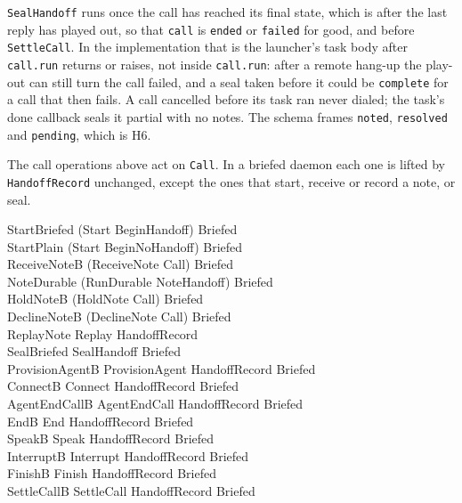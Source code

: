 \documentclass[a4paper,10pt,fleqn]{article}
\begin{document}
\texttt{SealHandoff} runs once the call has reached its final state, which
is after the last reply has played out, so that \texttt{call} is
\texttt{ended} or \texttt{failed} for good, and before
\texttt{SettleCall}. In the implementation that is the launcher's task
body after \texttt{call.run} returns or raises, not inside
\texttt{call.run}: after a remote hang-up the play-out can still turn the
call failed, and a seal taken before it could be \texttt{complete} for a
call that then fails. A call cancelled before its task ran never dialed;
the task's done callback seals it partial with no notes. The schema frames
\texttt{noted}, \texttt{resolved} and \texttt{pending}, which is H6.

The call operations above act on \texttt{Call}. In a briefed daemon each
one is lifted by \texttt{HandoffRecord} unchanged, except the ones that
start, receive or record a note, or seal.

\begin{zed}
  StartBriefed  (Start \land BeginHandoff) \land \Delta Briefed \\
  StartPlain  (Start \land BeginNoHandoff) \land \Delta Briefed \\
  ReceiveNoteB  (ReceiveNote \land \Xi Call) \land \Delta Briefed \\
  NoteDurable  (RunDurable \land NoteHandoff) \land \Delta Briefed \\
  HoldNoteB  (HoldNote \land \Xi Call) \land \Delta Briefed \\
  DeclineNoteB  (DeclineNote \land \Xi Call) \land \Delta Briefed \\
  ReplayNote  Replay \land \Xi HandoffRecord \\
  SealBriefed  SealHandoff \land \Delta Briefed \\
  ProvisionAgentB  ProvisionAgent \land \Xi HandoffRecord \land \Delta Briefed \\
  ConnectB  Connect \land \Xi HandoffRecord \land \Delta Briefed \\
  AgentEndCallB  AgentEndCall \land \Xi HandoffRecord \land \Delta Briefed \\
  EndB  End \land \Xi HandoffRecord \land \Delta Briefed \\
  SpeakB  Speak \land \Xi HandoffRecord \land \Delta Briefed \\
  InterruptB  Interrupt \land \Xi HandoffRecord \land \Delta Briefed \\
  FinishB  Finish \land \Xi HandoffRecord \land \Delta Briefed \\
  SettleCallB  SettleCall \land \Xi HandoffRecord \land \Delta Briefed
\end{zed}
\end{document}
